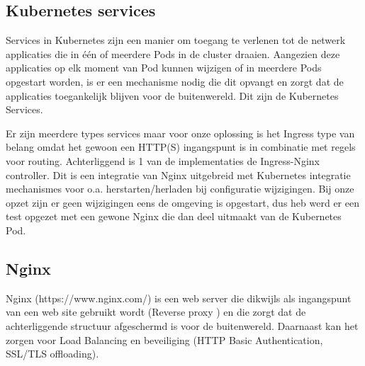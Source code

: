 \subsection{Kubernetes services}
Services in Kubernetes zijn een manier om toegang te verlenen tot de netwerk applicaties die in één of meerdere Pods in de cluster draaien. Aangezien deze applicaties op elk moment van Pod kunnen wijzigen of in meerdere Pods opgestart worden, is er een mechanisme nodig die dit opvangt en zorgt dat de applicaties toegankelijk blijven voor de buitenwereld. Dit zijn de Kubernetes Services.
\autocite{Kubernetes2023b}

Er zijn meerdere types services maar voor onze oplossing is het Ingress type van belang omdat het gewoon een HTTP(S) ingangspunt is in combinatie met regels voor routing. Achterliggend is 1 van de implementaties de Ingress-Nginx controller. Dit is een integratie van Nginx uitgebreid met Kubernetes integratie mechanismes voor o.a. herstarten/herladen bij configuratie wijzigingen. Bij onze opzet zijn er geen wijzigingen eens de omgeving is opgestart, dus heb werd er een test opgezet met een gewone Nginx die dan deel uitmaakt van de Kubernetes Pod.
\autocite{Kubernetes2023d}


\subsection{Nginx}
Nginx (https://www.nginx.com/) is een web server die dikwijls als ingangspunt van een web site gebruikt wordt (Reverse proxy \autocite{Wikipedia2023d}) en die zorgt dat de achterliggende structuur afgeschermd is voor de buitenwereld. Daarnaast kan het zorgen voor Load Balancing \autocite{Wikipedia2023c} en beveiliging (HTTP Basic Authentication, SSL/TLS offloading).
\newline
\newline


